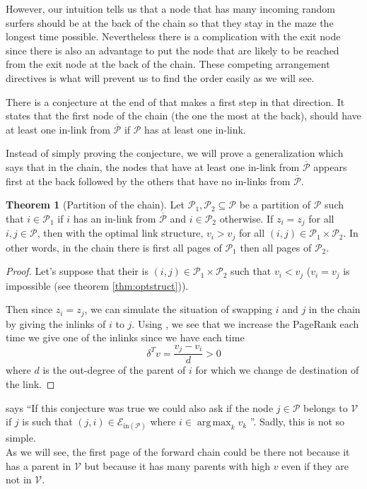 \documentclass{article}
\DeclareMathOperator*{\argmax}{arg\,max}
\newcommand{\1}{\mathbf{1}}
\theoremstyle{definition}
\newtheorem{mytheo}[mydef]{Theorem}
\begin{document}
However, our intuition tells us that a node that has many incoming random surfers should be at the back
of the chain so that they stay in the maze the longest time possible.
Nevertheless there is a complication with the exit node since there is also an advantage to put the node that are
likely to be reached from the exit node at the back of the chain.
These competing arrangement directives is what will prevent us to find the order easily as we will see.

There is a conjecture at the end of \cite{de2008maximizing} that makes a first step in that direction.
It states that the first node of the chain (the one the most at the back), should have at least one in-link from \(\overline{\mathcal{P}}\)
if \(\mathcal{P}\) has at least one in-link.

Instead of simply proving the conjecture, we will prove a generalization
which says that in the chain, the nodes that have at least one in-link from \(\overline{\mathcal{P}}\) appears first at the back
followed by the others that have no in-links from \(\overline{\mathcal{P}}\).
\begin{mytheo}[Partition of the chain]
  \label{theo:partition}
  Let \(\mathcal{P}_1,\mathcal{P}_2 \subseteq \mathcal{P}\) be a partition of \(\mathcal{P}\) such that
  \(i \in \mathcal{P}_1\) if \(i\) has an in-link from \(\overline{\mathcal{P}}\) and \(i \in \mathcal{P}_2\)
  otherwise.
  If \(z_i = z_j\) for all \(i,j \in \mathcal{P}\),
  then with the optimal link structure,
  \(v_i > v_j\) for all \((i,j) \in \mathcal{P}_1 \times \mathcal{P}_2\).
  In other words, in the chain there is first all pages of
  \(\mathcal{P}_1\) then all pages of \(\mathcal{P}_2\).
  \begin{proof}
    Let's suppose that their is \((i,j) \in \mathcal{P}_1 \times \mathcal{P}_2\)
    such that \(v_i < v_j\) (\(v_i = v_j\) is impossible (see theorem \ref{thm:optstruct})).

    Then since \(z_i = z_j\), we can simulate the situation of swapping \(i\) and \(j\) in the chain
    by giving the inlinks of \(i\) to \(j\).
    Using \cite[theorem~5]{de2008maximizing}, we see that we increase the PageRank each time we give one of the inlinks since
    we have each time
    \[ \delta^Tv = \frac{v_j - v_i}{d} > 0 \]
    where \(d\) is the out-degree of the parent of \(i\) for which we change de destination of the link.
  \end{proof}
\end{mytheo}

\cite{de2008maximizing} says
``If this conjecture was true we could also ask if the node \(j \in \mathcal{P}\) belongs to \(\mathcal{V}\) if \(j\) is such that
\((j, i) \in \mathcal{E}_{\text{in}(\mathcal{P})}\) where \(i \in \argmax_k v_k\) ''.
Sadly, this is not so simple. \\
As we will see, the first page of the forward chain could be there not
because it has a parent in \(\mathcal{V}\) but because it has many parents with high \(v\) even if they are not in \(\mathcal{V}\).
\end{document}
